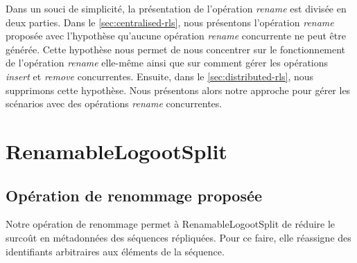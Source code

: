 \documentclass[12pt]{thesul}
\begin{document}
Dans un souci de simplicité, la présentation de l'opération \emph{rename} est divisée en deux parties.
Dans le \autoref{sec:centralised-rls}, nous présentons l'opération \emph{rename} proposée avec l'hypothèse qu'aucune opération \emph{rename} concurrente ne peut être générée.
Cette hypothèse nous permet de nous concentrer sur le fonctionnement de l'opération \emph{rename} elle-même ainsi que sur comment gérer les opérations \emph{insert} et \emph{remove} concurrentes.
Ensuite, dans le \autoref{sec:distributed-rls}, nous supprimons cette hypothèse.
Nous présentons alors notre approche pour gérer les scénarios avec des opérations \emph{rename} concurrentes.

\section{RenamableLogootSplit}
\label{sec:centralised-rls}
\subsection{Opération de renommage proposée}

Notre opération de renommage permet à RenamableLogootSplit de réduire le surcoût en métadonnées des séquences répliquées.
Pour ce faire, elle réassigne des identifiants arbitraires aux éléments de la séquence.
\end{document}
